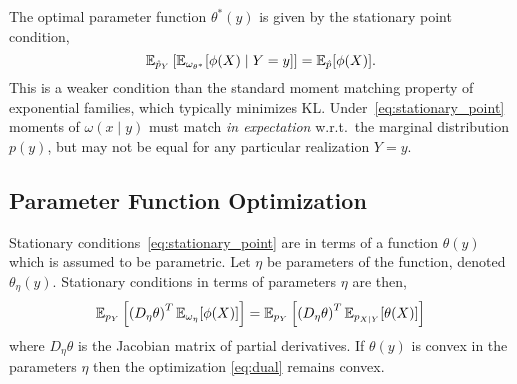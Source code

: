 The optimal parameter function $\theta^{*}(y)$ is given by the
stationary point condition,
\begin{equation}\label{eq:stationary_point}
  \mathbb{E}_{\hat{p}_Y}\left[ \mathbb{E}_{\omega_{\theta^{*}}}[ \phi(X) \mid Y=y ] \right] = \mathbb{E}_{\hat{p}}[\phi(X)].
\end{equation}
This is a weaker condition than the standard moment matching property
of exponential families, which typically minimizes KL.
Under~\eqref{eq:stationary_point} moments of $\omega(x\mid y)$ must
match \emph{in expectation} w.r.t.~the marginal distribution $p(y)$,
but may not be equal for any particular realization $Y=y$.


\subsection{Parameter Function Optimization}

Stationary conditions~\eqref{eq:stationary_point} are in terms of a
function $\theta(y)$ which is assumed to be parametric.  Let $\eta$ be
parameters of the function, denoted $\theta_{\eta}(y)$.  Stationary
conditions in terms of parameters $\eta$ are then,
\begin{equation*}
  \mathbb{E}_{p_Y}\left[ \left( D_\eta \theta \right)^T \mathbb{E}_{\omega_\eta}[\phi(X)]
    \right]
    = \mathbb{E}_{p_Y}\left[ \left( D_\eta \theta \right)^T \mathbb{E}_{p_{X\mid
          Y}}[ \theta(X) ] \right]
\end{equation*}
where $D_\eta \theta$ is the Jacobian matrix of partial derivatives.
If $\theta(y)$ is convex in the parameters $\eta$ then the
optimization \EQN\eqref{eq:dual} remains convex.


